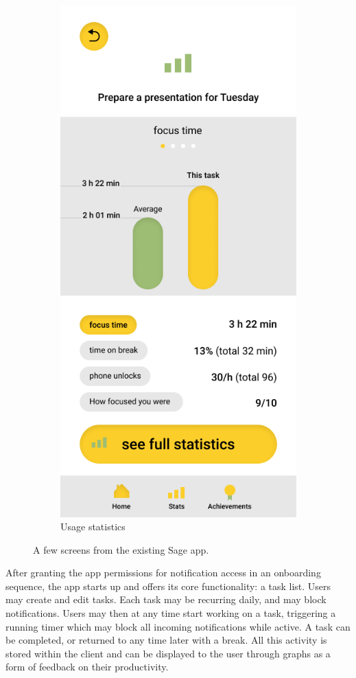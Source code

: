 \begin{figure}[htb!]
\begin{center}
\begin{subfigure}{.3\textwidth}
            \includegraphics[width=0.8\linewidth]{images/sage_statistics.png}
            \caption{Usage statistics}
            \label{fig:gmaps_gamify_congrat}
        \end{subfigure}%
        \caption{A few screens from the existing Sage app.}
        \label{fig:gmaps_gamification}
    \end{center}
\end{figure}

After granting the app permissions for notification access in an onboarding sequence, the app starts up and offers its core functionality: a task list. Users may create and edit tasks. Each task may be recurring daily, and may block notifications. Users may then at any time start working on a task, triggering a running timer which may block all incoming notifications while active. A task can be completed, or returned to any time later with a break. All this activity is stored within the client and can be displayed to the user through graphs as a form of feedback on their productivity.

